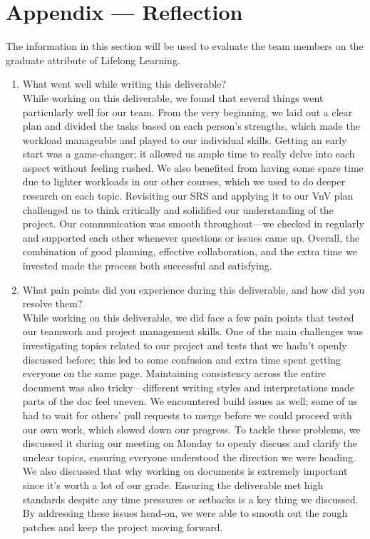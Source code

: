 \documentclass[12pt, titlepage]{article}
\begin{document}
\newpage{}
\section*{Appendix --- Reflection}


The information in this section will be used to evaluate the team members on the
graduate attribute of Lifelong Learning.



\begin{enumerate}
    \item What went well while writing this deliverable? 
    \\
    
    While working on this deliverable, we found that several things went particularly well for our team. From the very beginning, we laid out a clear plan and divided the tasks based on each person's strengths, which made the workload manageable and played to our individual skills. Getting an early start was a game-changer; it allowed us ample time to really delve into each aspect without feeling rushed. We also benefited from having some spare time due to lighter workloads in our other courses, which we used to do deeper research on each topic. Revisiting our SRS and applying it to our VnV plan challenged us to think critically and solidified our understanding of the project. Our communication was smooth throughout---we checked in regularly and supported each other whenever questions or issues came up. Overall, the combination of good planning, effective collaboration, and the extra time we invested made the process both successful and satisfying.
    
    \item What pain points did you experience during this deliverable, and how
      did you resolve them?
      \\
  
      While working on this deliverable, we did face a few pain points that tested our teamwork and project management skills. One of the main challenges was investigating topics related to our project and tests that we hadn't openly discussed before; this led to some confusion and extra time spent getting everyone on the same page. Maintaining consistency across the entire document was also tricky---different writing styles and interpretations made parts of the doc feel uneven. We encountered build issues as well; some of us had to wait for others' pull requests to merge before we could proceed with our own work, which slowed down our progress. To tackle these problems, we discussed it during our meeting on Monday to openly discuss and clarify the unclear topics, ensuring everyone understood the direction we were heading. We also discussed that why working on documents is extremely important since it's worth a lot of our grade. Ensuring the deliverable met high standards despite any time pressures or setbacks is a key thing we discussed. By addressing these issues head-on, we were able to smooth out the rough patches and keep the project moving forward. \\
      \smallskip
      

\end{enumerate}
\end{document}
